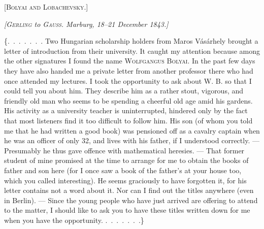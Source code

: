\clearpage
{}%
\begin{center}
{\Large\textsc{[Bolyai and Lobachevsky.]}}



\emph{[\textup{\textsc{Gerling}} to \textup{\textsc{Gauss}}. Marburg, 18--21 December 1843.]}
\end{center}


\{\mbox{.\ .\ .\ .\ .\ .\ .} Two Hungarian scholarship holders from Maros Vásárhely brought a
letter of introduction from their university. It caught my attention because among
the other signatures I found the name \textsc{Wolfgangus Bolyai}. In the
past few days they have also handed me a private letter from another professor there
who had once attended my lectures. I took the opportunity
to ask about W. B. so that I could tell you about him. They describe him as a
rather stout, vigorous, and friendly old man who seems to be spending
a cheerful old age amid his gardens. His activity as a university
teacher is uninterrupted, hindered only by the fact that most listeners find it too
difficult to follow him. His son (of whom you told me that he had written a
good book) was pensioned off as a cavalry captain when he was an officer of only 32,
and lives with his father, if I understood correctly. --- Presumably
he thus gave offence with mathematical heresies. --- That former
student of mine promised at the time to arrange for me to obtain the books of
father and son here (for I once saw a book of the father's at your house too, which
you called interesting). He seems graciously to have forgotten it,
for his letter contains not a word about it. Nor can I find out the titles anywhere
(even in Berlin). --- Since the young people who have just arrived
are offering to attend to the matter, I should like to ask you
to have these titles written down for me when you have the opportunity. \mbox{.\ .\ .\ .\ .\ .\ .}\}


